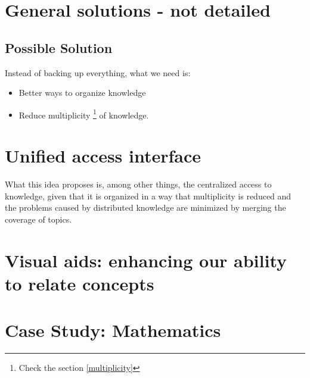 \section{General solutions - not detailed}
\subsection{Possible Solution}
\indent
Instead of backing up everything, what we need is:

\begin{itemize}
 \item Better ways to organize knowledge
 \item Reduce multiplicity
    \footnote{Check the section \ref{multiplicity}} 
    of knowledge. 
\end{itemize}
\par



\section{Unified access interface}

What this idea proposes is, among other things, the centralized
access to knowledge, given that it is organized in a way that 
multiplicity is reduced and the problems caused by distributed
knowledge are minimized by merging the coverage of topics.

\section{Visual aids: enhancing our ability to relate concepts}

\section{Case Study: Mathematics}
